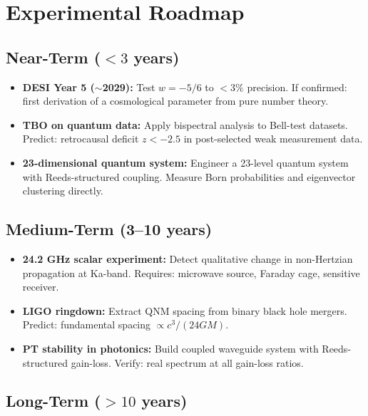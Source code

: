 \documentclass[12pt,a4paper]{article}
\theoremstyle{definition}\newtheorem{definition}[theorem]{Definition}
\theoremstyle{remark}\newtheorem{remark}[theorem]{Remark}
\begin{document}
\section{Experimental Roadmap}
\label{sec:roadmap}

\subsection{Near-Term ($< 3$ years)}

\begin{itemize}
  \item \textbf{DESI Year 5 ($\sim$2029):} Test $w = -5/6$ to $< 3\%$ precision.
  If confirmed: first derivation of a cosmological parameter from pure number
  theory.

  \item \textbf{TBO on quantum data:} Apply bispectral analysis to Bell-test
  datasets. Predict: retrocausal deficit $z < -2.5$ in post-selected weak
  measurement data.

  \item \textbf{23-dimensional quantum system:} Engineer a 23-level quantum
  system with Reeds-structured coupling. Measure Born probabilities and
  eigenvector clustering directly.
\end{itemize}

\subsection{Medium-Term (3--10 years)}

\begin{itemize}
  \item \textbf{24.2 GHz scalar experiment:} Detect qualitative change in
  non-Hertzian propagation at Ka-band. Requires: microwave source, Faraday cage,
  sensitive receiver.

  \item \textbf{LIGO ringdown:} Extract QNM spacing from binary black hole
  mergers. Predict: fundamental spacing $\propto c^3/(24 GM)$.

  \item \textbf{PT stability in photonics:} Build coupled waveguide system with
  Reeds-structured gain-loss. Verify: real spectrum at all gain-loss ratios.
\end{itemize}

\subsection{Long-Term ($> 10$ years)}
\end{document}
